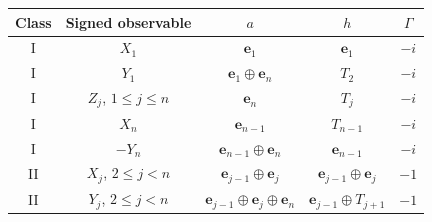 \par
\onecolumngrid
\medskip
\noindent\begin{minipage}{\textwidth}
\label{core:pullback-table}
\begin{tabular*}{\linewidth}{@{\extracolsep{\fill}}ccccc}
\toprule
Class&Signed observable&$a$&$h$&$\Gamma$\\
\midrule
I&$X_1$&$\mathbf e_1$&$\mathbf e_1$&$-i$\\
I&$Y_1$&$\mathbf e_1\oplus\mathbf e_n$&$T_2$&$-i$\\
I&$Z_j$, $1\le j\le n$&$\mathbf e_n$&$T_j$&$-i$\\
I&$X_n$&$\mathbf e_{n-1}$&$T_{n-1}$&$-i$\\
I&$-Y_n$&$\mathbf e_{n-1}\oplus\mathbf e_n$&$\mathbf e_{n-1}$&$-i$\\
II&$X_j$, $2\le j<n$&$\mathbf e_{j-1}\oplus\mathbf e_j$&$\mathbf e_{j-1}\oplus\mathbf e_j$&$-1$\\
II&$Y_j$, $2\le j<n$&$\mathbf e_{j-1}\oplus\mathbf e_j\oplus\mathbf e_n$&$\mathbf e_{j-1}\oplus T_{j+1}$&$-1$\\
\bottomrule
\end{tabular*}
\end{minipage}
\par\medskip
\twocolumngrid
